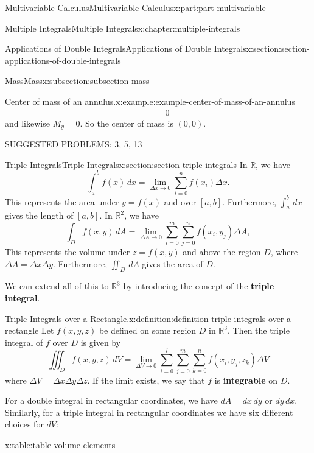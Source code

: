 \documentclass[twoside,10pt,]{tufte-book}
\newcommand{\terminology}[1]{\textbf{#1}}
\numberwithin{equation}{part}
\newcommand{\RR}{\mathbb{R}}
\begin{document}
\begin{partptx}{Multivariable Calculus}{}{Multivariable Calculus}{}{}{x:part:part-multivariable}
\begin{chapterptx}{Multiple Integrals}{}{Multiple Integrals}{}{}{x:chapter:multiple-integrals}
\begin{sectionptx}{Applications of Double Integrals}{}{Applications of Double Integrals}{}{}{x:section:section-applications-of-double-integrals}
\begin{subsectionptx}{Mass}{}{Mass}{}{}{x:subsection:subsection-mass}
\begin{example}{Center of mass of an annulus.}{x:example:example-center-of-mass-of-an-annulus}
\begin{align*}
& = 0 
\end{align*}
and likewise \(M_{y} = 0\). So the center of mass is \((0,0)\).%
\end{example}
\end{subsectionptx}
\begin{conclusion}{}%
SUGGESTED PROBLEMS: 3, 5, 13%
\end{conclusion}%
\end{sectionptx}
%
%
\typeout{************************************************}
\typeout{************************************************}
%
\begin{sectionptx}{Triple Integrals}{}{Triple Integrals}{}{}{x:section:section-triple-integrals}
In \(\RR\), we have%
\begin{equation*}
\int_{a}^{b}f(x)\,dx = \lim_{\Delta x\to0}\sum_{i=0}^{n}f(x_{i})\Delta x.
\end{equation*}
This represents the area under \(y=f(x)\) and over \([a,b]\). Furthermore, \(\int_{a}^{b}\,dx\) gives the length of \([a,b]\). In \(\mathbb{R}^{2}\), we have%
\begin{equation*}
\int_{D}f(x,y)\,dA = \lim_{\Delta A\to0}\sum_{i=0}^{m}\sum_{j=0}^{n}f(x_{i},y_{j})\Delta A,
\end{equation*}
This represents the volume under \(z = f(x,y)\) and above the region \(D\), where \(\Delta A = \Delta x\Delta y\). Furthermore, \(\iint_{D}\,dA\) gives the area of \(D\).%
\par
We can extend all of this to \(\RR^{3}\) by introducing the concept of the \terminology{triple integral}.%
\begin{definition}{Triple Integrals over a Rectangle.}{x:definition:definition-triple-integrals-over-a-rectangle}%
%
Let \(f(x,y,z)\) be defined on some region \(D\) in \(\RR^{3}\). Then the triple integral of \(f\) over \(D\) is given by%
\begin{equation*}
\iiint_{D}f(x,y,z)\,dV = \lim_{\Delta V\to0}\sum_{i=0}^{l}\sum_{j=0}^{m}\sum_{k=0}^{n}f(x_{i},y_{j},z_{k})\Delta V
\end{equation*}
where \(\Delta V = \Delta x\Delta y\Delta z\). If the limit exists, we say that \(f\) is \terminology{integrable} on \(D\).%
\end{definition}
For a double integral in rectangular coordinates, we have \(dA = dx\,dy\) or \(dy\,dx\). Similarly, for a triple integral in rectangular coordinates we have six different choices for \(dV\): \begin{tableptx}{\textbf{}}{x:table:table-volume-elements}{}%

\end{tableptx}
\end{sectionptx}
\end{chapterptx}
\end{partptx}
\end{document}

